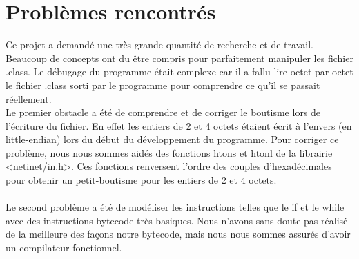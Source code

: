 \documentclass[12pt]{report}
\begin{document}
\section{Problèmes rencontrés}
Ce projet a demandé une très grande quantité de recherche et de travail. Beaucoup de concepts ont du être compris pour parfaitement manipuler les fichier .class. Le débugage du programme était complexe car il a fallu lire octet par octet le fichier .class sorti par le programme pour comprendre ce qu'il se passait réellement.\\
Le premier obstacle a été de comprendre et de corriger le boutisme lors de l'écriture du fichier. En effet les entiers de 2 et 4 octets étaient écrit à l'envers (en little-endian) lors du début du développement du programme. Pour corriger ce problème, nous nous sommes aidés des fonctions htons et htonl de la librairie <netinet/in.h>. Ces fonctions renversent l'ordre des couples d'hexadécimales pour obtenir un petit-boutisme pour les entiers de 2 et 4 octets.\\\\
Le second problème a été de modéliser les instructions telles que le if et le while avec des instructions bytecode très basiques. Nous n'avons sans doute pas réalisé de la meilleure des façons notre bytecode, mais nous nous sommes assurés d'avoir un compilateur fonctionnel.
\end{document}
